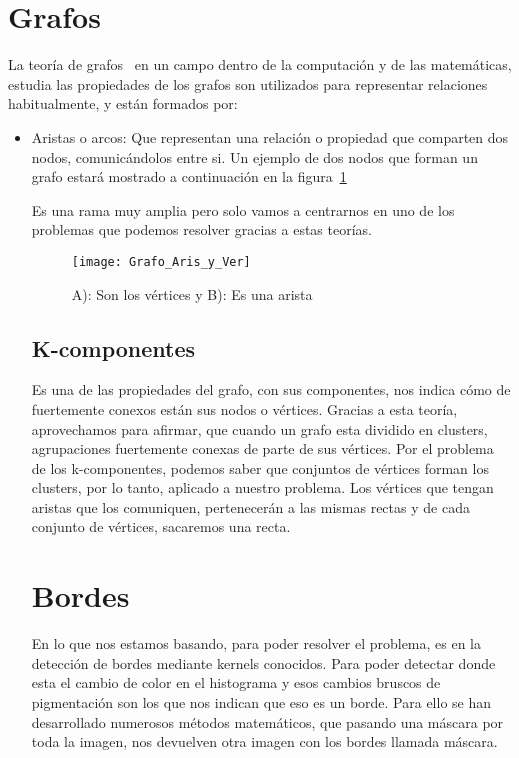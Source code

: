 \section{Grafos}	
La teoría de grafos~\cite{Wiki:Grafos} en un campo dentro de la computación y de las matemáticas, estudia las propiedades de los grafos son utilizados para representar relaciones habitualmente, y están formados por:
\begin{itemize}
	item Vértices o nodos: Que representan un objeto, persona o animal del entorno.
	\item Aristas o arcos: Que representan una relación o propiedad que comparten dos nodos, comunicándolos entre si.
Un ejemplo de dos nodos que forman un grafo estará mostrado a continuación en la figura~\ref{fig:3.7}

Es una rama muy amplia pero solo vamos a centrarnos en uno de los problemas que podemos resolver gracias a estas teorías.
\begin{figure}[h]
\centering
\texttt{[image: Grafo\_Aris\_y\_Ver]}
\caption{A): Son los vértices y B): Es una arista}
\label{fig:3.7}
\end{figure}

\subsection{K-componentes}
Es una de las propiedades del grafo, con sus componentes, nos indica cómo de fuertemente conexos están sus nodos o vértices.
Gracias a esta teoría, aprovechamos para afirmar, que cuando un grafo esta dividido en clusters, agrupaciones fuertemente conexas de parte de sus vértices.
Por el problema de los k-componentes, podemos saber que conjuntos de vértices forman los clusters, por lo tanto, aplicado a nuestro problema.
Los vértices que tengan aristas que los comuniquen, pertenecerán a las mismas rectas y de cada conjunto de vértices, sacaremos una recta.

\section{Bordes}
En lo que nos estamos basando, para poder resolver el problema,
es en la detección de bordes mediante kernels conocidos.
Para poder detectar donde esta el cambio de color en el histograma y esos cambios bruscos de pigmentación son los que nos indican que eso es un borde.
Para ello se han desarrollado numerosos métodos matemáticos, que pasando una máscara por toda la imagen, nos devuelven otra imagen con los bordes llamada máscara.


\end{itemize}
